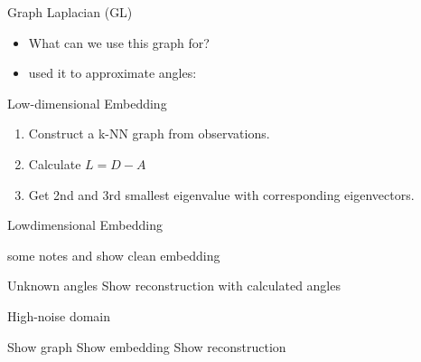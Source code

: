 \begin{frame}{Graph Laplacian (GL)}
\begin{itemize}
  \item What can we use this graph for?
  \item \cite{LaplaceRandomProjections} used it to approximate angles:
\end{itemize}

\begin{block}{Low-dimensional Embedding}
  \begin{enumerate}
    \item Construct a k-NN graph from observations.
    \item Calculate $L = D - A $
    \item Get 2nd and 3rd smallest eigenvalue with corresponding eigenvectors.
  \end{enumerate}
\end{block}

\end{frame}

%
%

\begin{frame}{Low\-dimensional Embedding}

  some notes and show clean embedding
  
\end{frame}


\begin{frame}{Unknown angles}
  Show reconstruction with calculated angles
\end{frame}
  

\begin{frame}{High-noise domain}

  Show graph
  Show embedding
  Show reconstruction

\end{frame}



